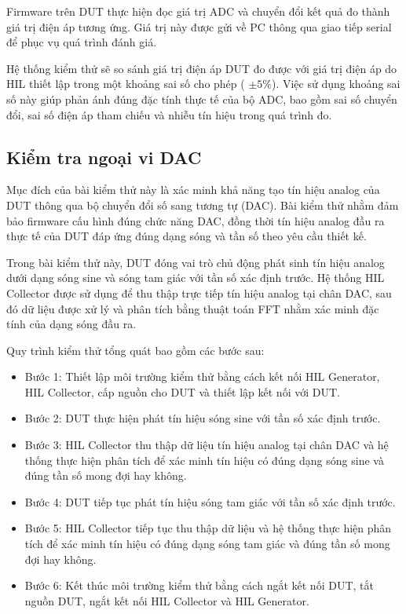 Firmware trên DUT thực hiện đọc giá trị ADC và chuyển đổi kết quả đo thành giá trị điện áp tương ứng. Giá trị này được gửi về PC thông qua giao tiếp serial để phục vụ quá trình đánh giá.

Hệ thống kiểm thử sẽ so sánh giá trị điện áp DUT đo được với giá trị điện áp do HIL thiết lập trong một khoảng sai số cho phép ( $\pm 5\%$). Việc sử dụng khoảng sai số này giúp phản ánh đúng đặc tính thực tế của bộ ADC, bao gồm sai số chuyển đổi, sai số điện áp tham chiếu và nhiễu tín hiệu trong quá trình đo.

\subsection{Kiểm tra ngoại vi DAC}

Mục đích của bài kiểm thử này là xác minh khả năng tạo tín hiệu analog của DUT thông qua bộ chuyển đổi số sang tương tự (DAC). Bài kiểm thử nhằm đảm bảo firmware cấu hình đúng chức năng DAC, đồng thời tín hiệu analog đầu ra thực tế của DUT đáp ứng đúng dạng sóng và tần số theo yêu cầu thiết kế.

Trong bài kiểm thử này, DUT đóng vai trò chủ động phát sinh tín hiệu analog dưới dạng sóng sine và sóng tam giác với tần số xác định trước. Hệ thống HIL Collector được sử dụng để thu thập trực tiếp tín hiệu analog tại chân DAC, sau đó dữ liệu được xử lý và phân tích bằng thuật toán FFT nhằm xác minh đặc tính của dạng sóng đầu ra.

Quy trình kiểm thử tổng quát bao gồm các bước sau:

\begin{itemize}
    \item Bước 1: Thiết lập môi trường kiểm thử bằng cách kết nối HIL Generator, HIL Collector, cấp nguồn cho DUT và thiết lập kết nối với DUT.
    \item Bước 2: DUT thực hiện phát tín hiệu sóng sine với tần số xác định trước.
    \item Bước 3: HIL Collector thu thập dữ liệu tín hiệu analog tại chân DAC và hệ thống thực hiện phân tích để xác minh tín hiệu có đúng dạng sóng sine và đúng tần số mong đợi hay không.
    \item Bước 4: DUT tiếp tục phát tín hiệu sóng tam giác với tần số xác định trước.
    \item Bước 5: HIL Collector tiếp tục thu thập dữ liệu và hệ thống thực hiện phân tích để xác minh tín hiệu có đúng dạng sóng tam giác và đúng tần số mong đợi hay không.
    \item Bước 6: Kết thúc môi trường kiểm thử bằng cách ngắt kết nối DUT, tắt nguồn DUT, ngắt kết nối HIL Collector và HIL Generator.
\end{itemize}


